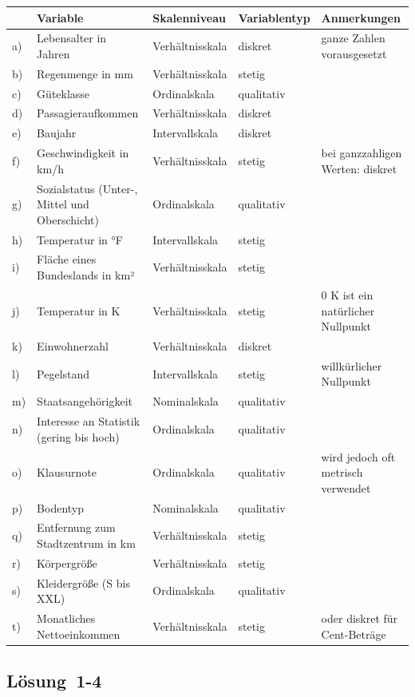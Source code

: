 \documentclass[
  11pt,
  ngerman,
  a4paper,
]{report}
\begin{document}
\begin{table}[H]
\centering
\begin{tabular}{lllll}
\toprule
  & Variable & Skalenniveau & Variablentyp & Anmerkungen\\
\midrule
a) & Lebensalter in Jahren & Verhältnisskala & diskret & ganze Zahlen vorausgesetzt\\
b) & Regenmenge in mm & Verhältnisskala & stetig & \\
c) & Güteklasse & Ordinalskala & qualitativ & \\
d) & Passagieraufkommen & Verhältnisskala & diskret & \\
e) & Baujahr & Intervallskala & diskret & \\
f) & Geschwindigkeit in km/h & Verhältnisskala & stetig & bei ganzzahligen Werten: diskret\\
g) & Sozialstatus (Unter-, Mittel und Oberschicht) & Ordinalskala & qualitativ & \\
h) & Temperatur in °F & Intervallskala & stetig & \\
i) & Fläche eines Bundeslands in km² & Verhältnisskala & stetig & \\
j) & Temperatur in K & Verhältnisskala & stetig & 0 K ist ein natürlicher Nullpunkt\\
k) & Einwohnerzahl & Verhältnisskala & diskret & \\
l) & Pegelstand & Intervallskala & stetig & willkürlicher Nullpunkt\\
m) & Staatsangehörigkeit & Nominalskala & qualitativ & \\
n) & Interesse an Statistik (gering bis hoch) & Ordinalskala & qualitativ & \\
o) & Klausurnote & Ordinalskala & qualitativ & wird jedoch oft metrisch verwendet\\
p) & Bodentyp & Nominalskala & qualitativ & \\
q) & Entfernung zum Stadtzentrum in km & Verhältnisskala & stetig & \\
r) & Körpergröße & Verhältnisskala & stetig & \\
s) & Kleidergröße (S bis XXL) & Ordinalskala & qualitativ & \\
t) & Monatliches Nettoeinkommen & Verhältnisskala & stetig & oder diskret für Cent-Beträge\\
\bottomrule
\end{tabular}
\end{table}

\hypertarget{loesung-1-4}{%
\subsection{Lösung~1-4}\label{loesung-1-4}}
\end{document}
